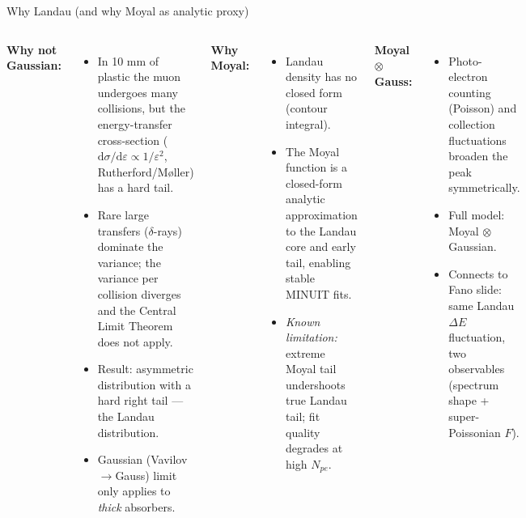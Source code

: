 \documentclass[aspectratio=169]{beamer}
\begin{document}
\begin{frame}{Why Landau (and why Moyal as analytic proxy)}

\begin{columns}[T]
\textbf{Why not Gaussian:}\par\smallskip
\begin{itemize}\footnotesize
  \item In 10 mm of plastic the muon undergoes many collisions, but
        the energy-transfer cross-section ($\mathrm{d}\sigma/\mathrm{d}\varepsilon\propto1/\varepsilon^2$,
        Rutherford/M{\o}ller) has a hard tail.
  \item Rare large transfers ($\delta$-rays) dominate the variance;
        the variance per collision diverges and the Central Limit Theorem
        does not apply.
  \item Result: asymmetric distribution with a hard right tail ---
        the Landau distribution.
  \item Gaussian (Vavilov$\to$Gauss) limit only applies to \emph{thick} absorbers.
\end{itemize}
\textbf{Why Moyal:}\par\smallskip
\begin{itemize}\footnotesize
  \item Landau density has no closed form (contour integral).
  \item The Moyal function is a closed-form analytic approximation
        to the Landau core and early tail, enabling stable MINUIT fits.
  \item \textit{Known limitation:} extreme Moyal tail undershoots
        true Landau tail; fit quality degrades at high $N_{pe}$.
\end{itemize}
\smallskip
\textbf{Moyal $\otimes$ Gauss:}\par\smallskip
\begin{itemize}\footnotesize
  \item Photo-electron counting (Poisson) and collection fluctuations
        broaden the peak symmetrically.
  \item Full model: Moyal $\otimes$ Gaussian.
  \item Connects to Fano slide: same Landau $\Delta E$ fluctuation,
        two observables (spectrum shape + super-Poissonian $F$).
\end{itemize}
\end{columns}

\end{frame}
\end{document}
